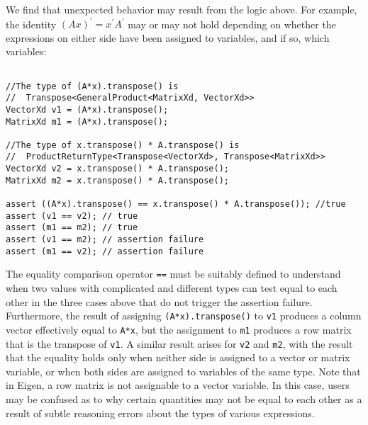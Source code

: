 We find that unexpected behavior may result from the logic above.
For example, the identity ${(Ax)}^{\prime}=x^{\prime}A^{\prime}$
may or may not hold depending on whether the expressions on either
side have been assigned to variables, and if so, which variables:
\begin{verbatim}

//The type of (A*x).transpose() is
//  Transpose<GeneralProduct<MatrixXd, VectorXd>>
VectorXd v1 = (A*x).transpose();
MatrixXd m1 = (A*x).transpose();

//The type of x.transpose() * A.transpose() is
//  ProductReturnType<Transpose<VectorXd>, Transpose<MatrixXd>>
VectorXd v2 = x.transpose() * A.transpose();
MatrixXd m2 = x.transpose() * A.transpose();

assert ((A*x).transpose() == x.transpose() * A.transpose()); //true
assert (v1 == v2); // true
assert (m1 == m2); // true
assert (v1 == m2); // assertion failure
assert (m1 == v2); // assertion failure

\end{verbatim}
The equality comparison operator \verb`==` must be suitably defined
to understand when two values with complicated and different types
can test equal to each other in the three cases above that do not
trigger the assertion failure. Furthermore, the result of assigning
\verb`(A*x).transpose()` to \verb`v1` produces a column vector effectively
equal to \verb`A*x`, but the assignment to \verb`m1` produces a
row matrix that is the transpose of \verb`v1`. A similar result arises
for \verb`v2` and \verb`m2`, with the result that the equality holds
only when neither side is assigned to a vector or matrix variable,
or when both sides are assigned to variables of the same type. Note
that in Eigen, a row matrix is not assignable to a vector variable.
In this case, users may be confused as to why certain quantities may
not be equal to each other as a result of subtle reasoning errors
about the types of various expressions.

